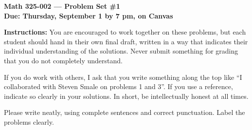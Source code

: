 \documentclass{amsart}
\begin{document}
\begin{center}
{\large\bfseries
Math 325-002 --- Problem Set \#1 \\
Due: Thursday, September 1 by 7 pm, on Canvas}
\end{center}





{\bf Instructions:} You are encouraged to work together on these
problems, but each student should hand in their own final draft,
written in a way that indicates their individual understanding of
the solutions. Never submit something for grading
that you do not completely understand. 

If you do work with others, I ask that you write something along the
top like ``I collaborated with Steven Smale on problems 1 and 3''.
If you use a reference, indicate so clearly in your solutions. 
In short, be intellectually
honest at all times.

Please write neatly, using complete sentences and correct
punctuation. Label the problems clearly. 
\end{document}
